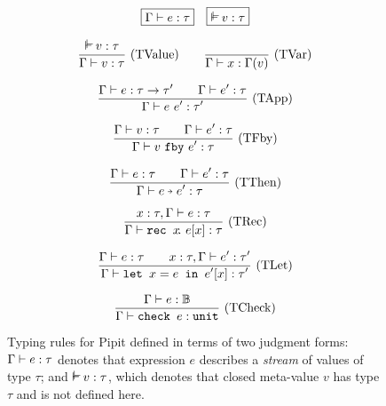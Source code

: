 
\begin{figure}
  \[
    \boxed{\typing{\Gamma}{e}{\tau}}
    \quad
    \boxed{\mtyping{}{v}{\tau}}
  \]

  \[
    \ruleIN{
      \mtyping{}{v}{\tau}
    }{
      \typing{\Gamma}{v}{\tau}
    }{TValue}
    \quad
    \ruleAx{\typing{\Gamma}{x}{\Gamma(v)}}{TVar}
  \]

  \[
    \enskip \frac {\displaystyle 
      \Gamma \vdash e : \tau \to \tau'
      \qquad
      \Gamma \vdash e' : \tau
    } {\displaystyle \Gamma \vdash e~e' : \tau'} \  \mbox{(TApp)} \enskip
  \]

  \[
    \enskip \frac {\displaystyle 
      \Gamma \vdash v : \tau
      \qquad
      \Gamma \vdash e' : \tau
    } {\displaystyle 
      \Gamma \vdash v~\texttt{fby}~e' : \tau
    } \  \mbox{(TFby)} \enskip
  \]

  \[
    \ruleIN{
      \typing{\Gamma}{e}{\tau}
      \qquad
      \typing{\Gamma}{e'}{\tau}
    }{\typing{\Gamma}{\xthen{e}{e'}}{\tau}}{TThen}
  \]

  \[
    \enskip \frac {\displaystyle 
      x : \tau, \Gamma \vdash e : \tau
    } {\displaystyle 
      \Gamma \vdash \texttt{rec~} x \!.~e[x] : \tau
    } \  \mbox{(TRec)} \enskip
  \]

  \[
    \enskip \frac {\displaystyle 
      \Gamma \vdash e : \tau
      \qquad
      x : \tau, \Gamma \vdash e' : \tau'
    } {\displaystyle 
      \Gamma \vdash \texttt{let~} x = e \texttt{~in~} e'[x] : \tau'
    } \  \mbox{(TLet)} \enskip
  \]

  \[
    \enskip \frac {\displaystyle 
      \Gamma \vdash e : \mathbb{B}
    } {\displaystyle 
      \Gamma \vdash \texttt{check~} e : \texttt{unit}
    } \  \mbox{(TCheck)} \enskip
  \]

  \caption{Typing rules for Pipit defined in terms of two judgment forms: $\Gamma \vdash e : \tau$ denotes that expression $e$ describes a \emph{stream} of values of type $\tau$; and $\mtyping{}{v}{\tau}$, which denotes that closed meta-value $v$ has type $\tau$ and is not defined here.}\label{f:core-typing}
\end{figure}